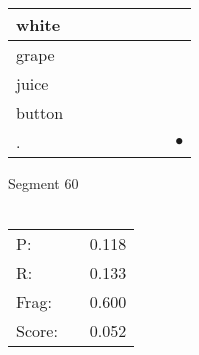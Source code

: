 \documentclass[landscape]{article}
\newcommand{\ssp}{\hspace{2pt}}
\newcommand{\mex}{\cellcolor{g}$\bullet$}
\begin{document}
\begin{tabular}{|l|p{10pt}|p{10pt}|p{10pt}|p{10pt}|p{10pt}|p{10pt}|p{10pt}|}
\hline
\ssp white \ssp&\hspace{2pt}&\hspace{2pt}&\hspace{2pt}&\hspace{2pt}&\hspace{2pt}&\hspace{2pt}&\hspace{2pt}\\
\hline
\ssp grape \ssp&\hspace{2pt}&\hspace{2pt}&\hspace{2pt}&\hspace{2pt}&\hspace{2pt}&\hspace{2pt}&\hspace{2pt}\\
\hline
\ssp juice \ssp&\hspace{2pt}&\hspace{2pt}&\hspace{2pt}&\hspace{2pt}&\hspace{2pt}&\hspace{2pt}&\hspace{2pt}\\
\hline
\ssp button \ssp&\hspace{2pt}&\hspace{2pt}&\hspace{2pt}&\hspace{2pt}&\hspace{2pt}&\hspace{2pt}&\hspace{2pt}\\
\hline
\ssp \cellcolor{ref6}. \ssp&\hspace{2pt}&\hspace{2pt}&\hspace{2pt}&\hspace{2pt}&\hspace{2pt}&\hspace{2pt}&\hspace{2pt}\mex\\
\hline
\end{tabular}

\vspace{6pt}
\noindent Segment 60\\\\
\noindent\begin{tabular}{lm{12pt}r}
\hline
P:&&0.118\\
R:&&0.133\\
Frag:&&0.600\\
Score:&&0.052\\
\end{tabular}
\end{document}
